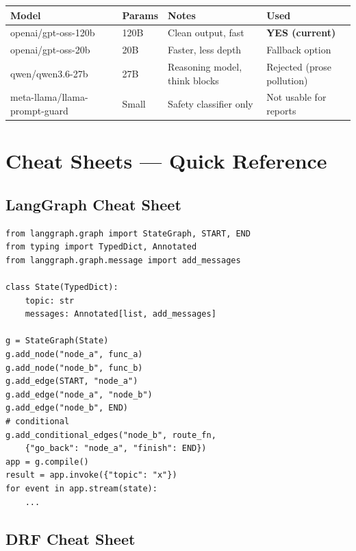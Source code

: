 \begin{longtable}{p{4cm} p{3.4cm} p{3.4cm} p{3.4cm}}
\toprule
\textbf{Model} & \textbf{Params} & \textbf{Notes} & \textbf{Used} \\
\midrule
openai/gpt-oss-120b & 120B & Clean output, fast & \textbf{YES (current)} \\
openai/gpt-oss-20b & 20B & Faster, less depth & Fallback option \\
qwen/qwen3.6-27b & 27B & Reasoning model, think blocks & Rejected (prose pollution) \\
meta-llama/llama-prompt-guard & Small & Safety classifier only & Not usable for reports \\
\bottomrule
\end{longtable}

\section{Cheat Sheets --- Quick Reference}

\subsection{LangGraph Cheat Sheet}

\begin{codestorybox}
\begin{lstlisting}[style=pythonstyle, caption={LangGraph essentials}]
from langgraph.graph import StateGraph, START, END
from typing import TypedDict, Annotated
from langgraph.graph.message import add_messages

class State(TypedDict):
    topic: str
    messages: Annotated[list, add_messages]

g = StateGraph(State)
g.add_node("node_a", func_a)
g.add_node("node_b", func_b)
g.add_edge(START, "node_a")
g.add_edge("node_a", "node_b")
g.add_edge("node_b", END)
# conditional
g.add_conditional_edges("node_b", route_fn,
    {"go_back": "node_a", "finish": END})
app = g.compile()
result = app.invoke({"topic": "x"})
for event in app.stream(state):
    ...
\end{lstlisting}
\end{codestorybox}

\subsection{DRF Cheat Sheet}

